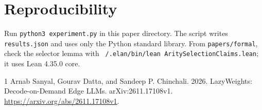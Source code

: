 \documentclass[11pt]{article}
\begin{document}
\section*{Reproducibility}
Run \texttt{python3 experiment.py} in this paper directory. The script writes \texttt{results.json} and uses only the Python standard library. From \texttt{papers/formal}, check the selector lemma with \texttt{\string~/.elan/bin/lean AritySelectionClaims.lean}; it uses Lean 4.35.0 core.

\begin{thebibliography}{1}
Arnab Sanyal, Gourav Datta, and Sandeep P. Chinchali. 2026. \newblock LazyWeights: Decode-on-Demand Edge LLMs. \newblock arXiv:2611.17108v1. \url{https://arxiv.org/abs/2611.17108v1}.
\end{thebibliography}
\end{document}
